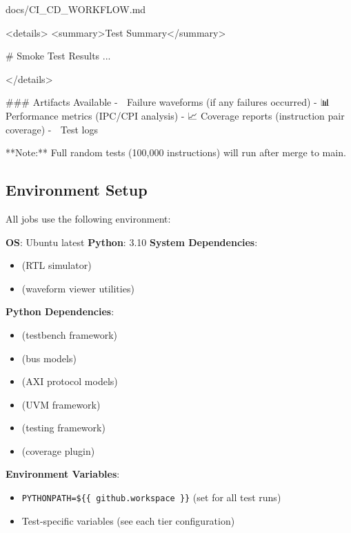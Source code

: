 \begin{relocated}{docs/CI_CD_WORKFLOW.md}
\begin{textblock}
<details>
<summary>Test Summary</summary>

# Smoke Test Results
...

</details>

### Artifacts Available
- 🌊 Failure waveforms (if any failures occurred)
- 📊 Performance metrics (IPC/CPI analysis)
- 📈 Coverage reports (instruction pair coverage)
- 📝 Test logs

**Note:** Full random tests (100,000 instructions) will run after merge to main.
\end{textblock}

\subsection{Environment Setup}\label{um:flow:ci-cd-workflow:environment-setup}

All jobs use the following environment:

\textbf{OS}: Ubuntu latest \textbf{Python}: 3.10 \textbf{System
Dependencies}:

\begin{itemize}
\tightlist
\item
   (RTL simulator)
\item
   (waveform viewer utilities)
\end{itemize}

\textbf{Python Dependencies}:

\begin{itemize}
\tightlist
\item
   (testbench framework)
\item
   (bus models)
\item
   (AXI protocol models)
\item
   (UVM framework)
\item
   (testing framework)
\item
   (coverage plugin)
\end{itemize}

\textbf{Environment Variables}:

\begin{itemize}
\tightlist
\item
  \texttt{PYTHONPATH=\allowbreak{}\$\{\{\ github.\allowbreak{}workspace\ \}\}}
  (set for all test runs)
\item
  Test-specific variables (see each tier configuration)
\end{itemize}


\end{relocated}
